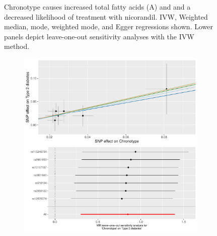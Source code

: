\documentclass{article}
\begin{document}
\begin{figure}[htbp]
\begin{subfigure}[b]{0.4\textwidth}
         \caption{}
         \label{nicorandil}
     \end{subfigure}
        \caption{Chronotype causes increased total fatty acids (A) and and a decreased likelihood of treatment with nicorandil. IVW, Weighted median, mode, weighted mode, and Egger regressions shown. Lower panels depict leave-one-out sensitivity analyses with the IVW method.}
        \label{fffanicorandil}
\end{figure}


\begin{figure}[htbp]
     \centering
     \begin{subfigure}[b]{0.4\textwidth}
         \centering
         \includegraphics[width=\textwidth]{Figs/Analysis2/Chronotype_vs_Type_2_diabetes.Plots.pdf}
         \caption{}
         \label{t2dm}
     \end{subfigure}
     \begin{subfigure}[b]{0.4\textwidth}
         \centering

\end{subfigure}
\end{figure}
\end{document}
